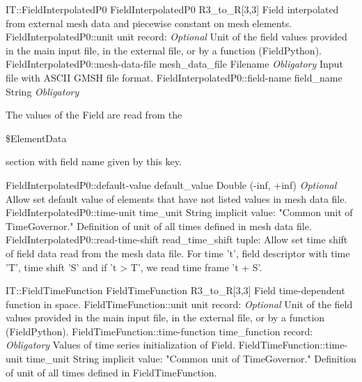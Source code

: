 \begin{RecordType}
	{IT::FieldInterpolatedP0}
	{FieldInterpolatedP0}
	{}%
	{}%
	{{{R3{\_}to{\_}R[3,3] Field interpolated from external mesh data and piecewise constant on mesh elements.}%
}}
		\RecKey
			{FieldInterpolatedP0::unit}
			{unit}
			{{record: }}{}
			{ \it{Optional}}
			{{{Unit of the field values provided in the main input file, in the external file, or by a function (FieldPython).}%
}}
		\RecKey
			{FieldInterpolatedP0::mesh-data-file}
			{mesh{\_}data{\_}file}
			{{Filename}}{}
			{ \it{Obligatory}}
			{{{Input file with ASCII GMSH file format.}%
}}
		\RecKey
			{FieldInterpolatedP0::field-name}
			{field{\_}name}
			{{String}}{}
			{ \it{Obligatory}}
			{{{The values of the Field are read from the }\begin{ttfamily}{\$}ElementData\end{ttfamily}{ section with field name given by this key.}%
}}
		\RecKey
			{FieldInterpolatedP0::default-value}
			{default{\_}value}
			{{Double (-inf, +inf)}}{}
			{ \it{Optional}}
			{{{Allow set default value of elements that have not listed values in mesh data file.}%
}}
		\RecKey
			{FieldInterpolatedP0::time-unit}
			{time{\_}unit}
			{{String}}{}
			{implicit value: "{Common unit of TimeGovernor.}"}
			{{{Definition of unit of all times defined in mesh data file.}%
}}
		\RecKey
			{FieldInterpolatedP0::read-time-shift}
			{read{\_}time{\_}shift}
			{{tuple: }}{}
			{ }
			{{{Allow set time shift of field data read from the mesh data file.
For time 't', field descriptor with time 'T', time shift 'S' and if 't {\textgreater} T', we read time frame 't + S'.}%
}}
\end{RecordType}
\begin{RecordType}
	{IT::FieldTimeFunction}
	{FieldTimeFunction}
	{}%
	{}%
	{{{R3{\_}to{\_}R[3,3] Field time-dependent function in space.}%
}}
		\RecKey
			{FieldTimeFunction::unit}
			{unit}
			{{record: }}{}
			{ \it{Optional}}
			{{{Unit of the field values provided in the main input file, in the external file, or by a function (FieldPython).}%
}}
		\RecKey
			{FieldTimeFunction::time-function}
			{time{\_}function}
			{{record: }}{}
			{ \it{Obligatory}}
			{{{Values of time series initialization of Field.}%
}}
		\RecKey
			{FieldTimeFunction::time-unit}
			{time{\_}unit}
			{{String}}{}
			{implicit value: "{Common unit of TimeGovernor.}"}
			{{{Definition of unit of all times defined in FieldTimeFunction.}%
}}
\end{RecordType}
